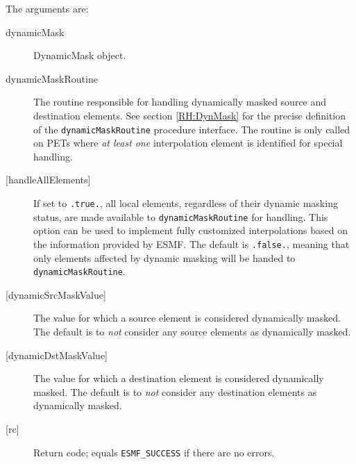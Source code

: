      The arguments are:
     \begin{description}
     \item[dynamicMask] 
       DynamicMask object.
     \item [dynamicMaskRoutine]
       The routine responsible for handling dynamically masked source and 
       destination elements. See section \ref{RH:DynMask} for the precise
       definition of the {\tt dynamicMaskRoutine} procedure interface.
       The routine is only called on PETs where {\em at least one} interpolation 
       element is identified for special handling.
     \item [{[handleAllElements]}]
       If set to {\tt .true.}, all local elements, regardless of their dynamic
       masking status, are made available to {\tt dynamicMaskRoutine} for
       handling. This option can be used to implement fully customized
       interpolations based on the information provided by ESMF.
       The default is {\tt .false.}, meaning that only elements affected by
       dynamic masking will be handed to {\tt dynamicMaskRoutine}.
     \item [{[dynamicSrcMaskValue]}]
       The value for which a source element is considered dynamically
       masked.
       The default is to {\em not} consider any source elements as
       dynamically masked.
     \item [{[dynamicDstMaskValue]}]
       The value for which a destination element is considered dynamically
       masked.
       The default is to {\em not} consider any destination elements as
       dynamically masked.
     \item[{[rc]}] 
       Return code; equals {\tt ESMF\_SUCCESS} if there are no errors.
     \end{description}
  
\setlength{\parskip}{\oldparskip}
\setlength{\parindent}{\oldparindent}
\setlength{\baselineskip}{\oldbaselineskip}
